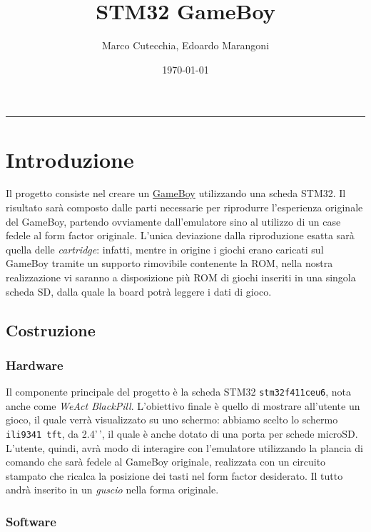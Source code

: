 \documentclass[12pt]{article}
\title{STM32 GameBoy}
\date{\today}
\author{Marco Cutecchia, Edoardo Marangoni}
\begin{document}
\maketitle
\begin{center}\rule{0.5\linewidth}{0.5pt}\end{center}

\section{Introduzione}

Il progetto consiste nel creare un
\href{https://it.wikipedia.org/wiki/Game_Boy}{GameBoy} utilizzando una
scheda STM32. Il risultato sarà composto dalle parti necessarie per
riprodurre l'esperienza originale del GameBoy, partendo ovviamente
dall'emulatore sino al utilizzo di un case fedele al form factor
originale. L'unica deviazione dalla riproduzione esatta sarà quella
delle \emph{cartridge}: infatti, mentre in origine i giochi erano
caricati sul GameBoy tramite un supporto rimovibile contenente la ROM,
nella nostra realizzazione vi saranno a disposizione più ROM di giochi
inseriti in una singola scheda SD, dalla quale la board potrà leggere i
dati di gioco.

\subsection{Costruzione}

\subsubsection{Hardware}

Il componente principale del progetto è la scheda STM32
\texttt{stm32f411ceu6}, nota anche come \emph{WeAct BlackPill}.
L'obiettivo finale è quello di mostrare all'utente un gioco, il quale
verrà visualizzato su uno schermo: abbiamo scelto lo schermo
\texttt{ili9341\ tft}, da 2.4'\,', il quale è anche dotato di una porta
per schede microSD. L'utente, quindi, avrà modo di interagire con
l'emulatore utilizzando la plancia di comando che sarà fedele al GameBoy
originale, realizzata con un circuito stampato che ricalca la posizione
dei tasti nel form factor desiderato. Il tutto andrà inserito in un
\emph{guscio} nella forma originale.

\subsubsection{Software}
\end{document}
